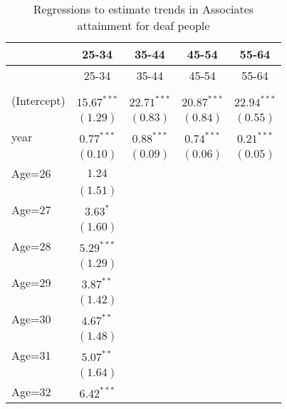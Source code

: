 \documentclass[fullpage]{paper}
\begin{document}
\begin{center}
\begin{longtable}{l c c c c }
\hline
 & 25-34 & 35-44 & 45-54 & 55-64 \\
\hline
\endfirsthead
\hline
 & 25-34 & 35-44 & 45-54 & 55-64 \\
\hline
\endhead
\hline
\endfoot
\hline
\multicolumn{5}{l}{\scriptsize{$^{***}p<0.001$, $^{**}p<0.01$, $^*p<0.05$}}\\
\caption{Regressions to estimate trends in Associates attainment for deaf people}
\label{table:coefficients}
\endlastfoot
(Intercept) & $15.67^{***}$ & $22.71^{***}$ & $20.87^{***}$ & $22.94^{***}$ \\
            & $(1.29)$      & $(0.83)$      & $(0.84)$      & $(0.55)$      \\
year        & $0.77^{***}$  & $0.88^{***}$  & $0.74^{***}$  & $0.21^{***}$  \\
            & $(0.10)$      & $(0.09)$      & $(0.06)$      & $(0.05)$      \\
Age=26      & $1.24$        &               &               &               \\
            & $(1.51)$      &               &               &               \\
Age=27      & $3.63^{*}$    &               &               &               \\
            & $(1.60)$      &               &               &               \\
Age=28      & $5.29^{***}$  &               &               &               \\
            & $(1.29)$      &               &               &               \\
Age=29      & $3.87^{**}$   &               &               &               \\
            & $(1.42)$      &               &               &               \\
Age=30      & $4.67^{**}$   &               &               &               \\
            & $(1.48)$      &               &               &               \\
Age=31      & $5.07^{**}$   &               &               &               \\
            & $(1.64)$      &               &               &               \\
Age=32      & $6.42^{***}$  &               &               &               \\

\end{longtable}
\end{center}
\end{document}
